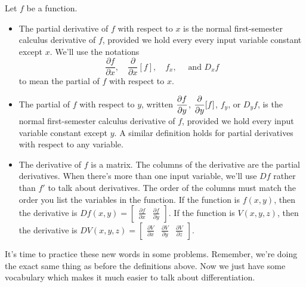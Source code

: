 \begin{dfn}
 Let $f$ be a function. 
\begin{itemize}
 \item The partial derivative of $f$ with respect to $x$ is the normal first-semester calculus derivative of $f$, provided we hold every every input variable constant except $x$.  We'll use the notations
 $$
 \frac{\partial f}{\partial x},
 \quad \frac{\partial}{\partial x}[f],
 \quad f_x,
 \quad \text{ and }D_x f 
 $$
to mean the partial of $f$ with respect to $x$.
 \item The partial of $f$ with respect to $y$, written $\displaystyle \frac{\partial f}{\partial y}$, $\displaystyle \frac{\partial }{\partial y}[f]$, $f_y$, or $D_yf$, is the normal first-semester calculus derivative of $f$, provided we hold every input variable constant except $y$. A similar definition holds for partial derivatives with respect to any variable.
 \item{}%
 The derivative of $f$ is a matrix. The columns of the derivative are the partial derivatives. When there's more than one input variable, we'll use $Df$ rather than $f'$ to talk about derivatives.  The order of the columns must match the order you list the variables in the function. If the function is $f(x,y)$, then the derivative is 
 $Df(x,y) = \begin{bmatrix}\frac{\partial f}{\partial x}&\frac{\partial f}{\partial y}\end{bmatrix}.$
 If the function is $V(x,y,z)$, then the derivative is 
 $DV(x,y,z) = \begin{bmatrix}\frac{\partial V}{\partial x}&\frac{\partial V}{\partial y}&\frac{\partial V}{\partial z}\end{bmatrix}.$
 
\end{itemize}
\end{dfn}

It's time to practice these new words in some problems.  Remember, we're doing the exact same thing as before the definitions above. Now we just have some vocabulary which makes it much easier to talk about differentiation.

